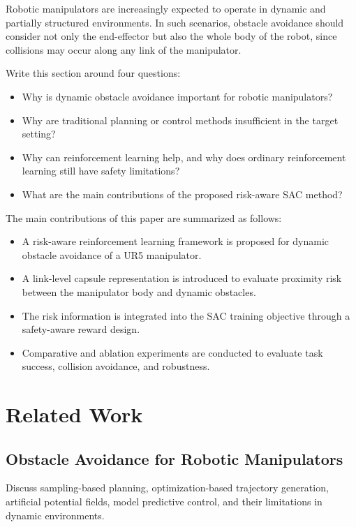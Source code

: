 \documentclass{ieeeaccess}
\begin{document}
Robotic manipulators are increasingly expected to operate in dynamic and partially structured environments.
In such scenarios, obstacle avoidance should consider not only the end-effector but also the whole body of the robot, since collisions may occur along any link of the manipulator.

Write this section around four questions:
\begin{itemize}
    \item Why is dynamic obstacle avoidance important for robotic manipulators?
    \item Why are traditional planning or control methods insufficient in the target setting?
    \item Why can reinforcement learning help, and why does ordinary reinforcement learning still have safety limitations?
    \item What are the main contributions of the proposed risk-aware SAC method?
\end{itemize}

The main contributions of this paper are summarized as follows:
\begin{itemize}
    \item A risk-aware reinforcement learning framework is proposed for dynamic obstacle avoidance of a UR5 manipulator.
    \item A link-level capsule representation is introduced to evaluate proximity risk between the manipulator body and dynamic obstacles.
    \item The risk information is integrated into the SAC training objective through a safety-aware reward design.
    \item Comparative and ablation experiments are conducted to evaluate task success, collision avoidance, and robustness.
\end{itemize}

\section{Related Work}
\label{sec:related_work}

\subsection{Obstacle Avoidance for Robotic Manipulators}
Discuss sampling-based planning, optimization-based trajectory generation, artificial potential fields, model predictive control, and their limitations in dynamic environments.
\end{document}
